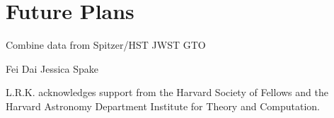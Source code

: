 \documentclass[twocolumn]{aastex61}
\begin{document}
\section{Future Plans}
Combine data from Spitzer/HST
JWST GTO


\acknowledgments
Fei Dai
Jessica Spake

L.R.K. acknowledges support from the Harvard Society of Fellows and the Harvard Astronomy Department Institute for Theory and Computation.

\vspace{5mm}







\end{document}

